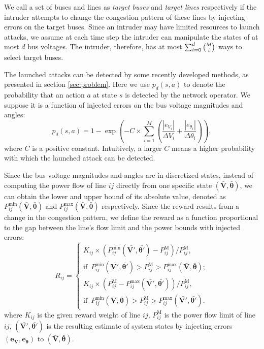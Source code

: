 \documentclass[conference,letterpaper,10pt]{IEEEtran}
\begin{document}
 We call a set of  buses and lines as \textit{target buses} and \textit{target lines} respectively if the intruder attempts to change the congestion pattern of these lines by injecting errors on the target buses. Since an intruder may have limited resources to launch attacks, we assume at each time step the intruder can manipulate the states of at most $d$ bus voltages. The intruder, therefore, has at most $\sum_{i=0}^{d}\tbinom{M}{i}$ ways to select target buses.



 


The launched attacks can be detected by some recently developed methods, as presented in section \ref{sec:problem}. Here we use $p_d(s,a)$ to denote the probability that an action $a$ at state $s$ is detected by the network operator. We suppose it is a function of injected errors on the bus voltage magnitudes and angles:
\begin{equation}\label{eqn: detection probability}
p_d(s,a)=1-\exp\left(-C\times\sum_{i=1}^{M}\left(\frac{|e_{V_i}|}{\Delta V_i}+\frac{|e_{\theta_i}|}{\Delta \theta_i}\right)\right),
\end{equation}
where $C$ is a positive constant. Intuitively, a larger $C$ means a higher probability with which the launched attack can be detected.

Since the bus voltage magnitudes and angles are in discretized states, instead of computing the power flow of line $ij$ directly from one specific state $(\bar{\bm{V}},\bar{\bm{\theta}})$, we can obtain the lower and upper bound of its absolute value, denoted as $P_{ij}^{\min}(\bar{\bm{V}},\bar{\bm{\theta}})$ and $P_{ij}^{\max}(\bar{\bm{V}},\bar{\bm{\theta}})$ respectively.
Since the reward results from a change in the congestion pattern, we define the reward as a function proportional to the gap between the line's flow limit and the power bounds with injected errors:
\begin{equation}\label{eqn: attack reward}
R_{ij}=
\begin{cases}
K_{ij}\times \left( P_{ij}^{\min}(\bar{\bm{V'}}, \bar{\bm{\theta'}})-P_{ij}^{\text{M}} \right)/P_{ij}^{\text{M}}, \\
\text{if}\enspace P_{ij}^{\min}(\bar{\bm{V'}}, \bar{\bm{\theta'}})>P_{ij}^{\text{M}}>P_{ij}^{\max}(\bar{\bm{V}},\bar{\bm{\theta}}); \\
K_{ij}\times \left( P_{ij}^{\text{M}}-P_{ij}^{\max}(\bar{\bm{V'}}, \bar{\bm{\theta'}}) \right)/P_{ij}^{\text{M}}, \\
\text{if}\enspace P_{ij}^{\min}(\bar{\bm{V}}, \bar{\bm{\theta}})>P_{ij}^{\text{M}}>P_{ij}^{\max}(\bar{\bm{V'}},\bar{\bm{\theta'}}).		
\end{cases}
\end{equation}
where $K_{ij}$ is the given reward weight of line $ij$, $P_{ij}^{\text{M}}$ is the power flow limit of line $ij$, $(\bar{\bm{V'}},\bar{\bm{\theta'}})$ is the resulting estimate of system states by injecting errors $(\bm{e_V},\bm{e_\theta})$ to $(\bar{\bm{V}},\bar{\bm{\theta}})$. 
\end{document}
